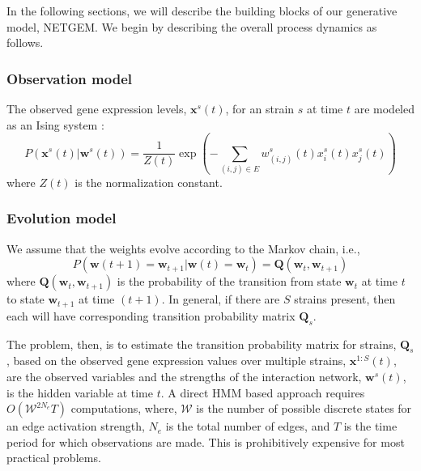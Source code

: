 \documentclass{bioinfo}
\begin{document}
\begin{methods}
In the following sections, we will describe the building blocks
of our generative model, NETGEM. We begin by describing the overall
process dynamics as follows. 

\subsubsection{Observation model}
\label{observation-model}

The observed gene expression levels, $\mathbf{x}^{s}(t)$, for an strain
$s$ at time $t$ are modeled as an Ising system \citep{Song09KELLER}:
\begin{equation}
\label{eq:ising}
 P\left(\mathbf{x}^{s}(t) | \mathbf{w}^{s}(t)\right) = 
      \frac{1}{Z(t)} \exp \left( - \sum_{(i,j) \in E} w^s_{(i,j)}(t)
        x^{s}_i(t) x^{s}_j(t)\right)  
\end{equation}
where $Z(t)$ is the normalization constant. 

\subsubsection{Evolution model }
\label{sec:evolution-model}
We assume that the weights evolve according to the Markov chain, i.e.,
\begin{equation}
  \label{eq:q-evol}
 P(\mathbf{w}(t+1) = \mathbf{w}_{t+1} |  \mathbf{w}(t) = \mathbf{w}_{t}) = \mathbf{Q}(\mathbf{w}_{t}, \mathbf{w}_{t+1})
\end{equation}
where $\mathbf{Q}(\mathbf{w}_{t}, \mathbf{w}_{t+1})$ is the probability of the
transition from state $\mathbf{w}_{t}$ at time $t$ to state
$\mathbf{w}_{t+1}$ at time $(t+1)$. In general, if there are $S$
strains present, then each will have corresponding transition
probability matrix $\mathbf{Q}_{s}$. 

 
The problem, then, is to estimate the transition probability matrix for
strains, $\mathbf{Q}_{s}$, based on the observed gene expression values over
multiple strains, $\mathbf{x}^{1:S}(t)$, are the observed variables
and the strengths of the interaction network, $\mathbf{w}^{s}(t)$, is  the
hidden variable at time $t$. A direct HMM based approach requires $O({\mathcal W}^{2
  N_{e}}T)$ computations, where, ${\mathcal W}$ is the number of
possible discrete states for an edge activation strength, $N_{e}$ is
the total number of edges, and $T$ is the time 
period for which observations are made.  This is prohibitively
expensive for most practical problems. 



\end{methods}
\end{document}

